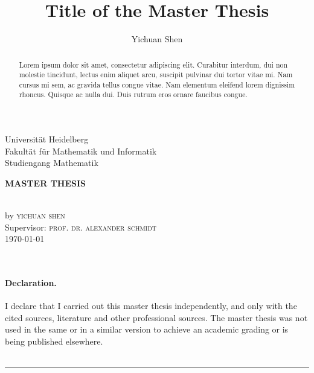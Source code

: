 \documentclass[11pt,a4paper,openany]{memoir}
\author{Yichuan Shen}
\title{Title of the Master Thesis}
\begin{document}
\theoremstyle{plain}
\theoremstyle{definition}
\newtheorem{theorem}{Theorem}[chapter]
\newtheorem{lemma}[theorem]{Lemma}
\newtheorem{proposition}[theorem]{Proposition}
\newtheorem{corollary}[theorem]{Corollary}
\theoremstyle{definition}
\newtheorem*{definition}{Definition}
\newtheorem*{example}{Example}
\theoremstyle{remark}
\newtheorem*{remark}{Remark}

\frontmatter
{} 

\makeatletter
\begin{center}
\vspace*{0cm}
\begin{large}
Universität Heidelberg\\
Fakultät für Mathematik und Informatik\\
Studiengang Mathematik\\
\vspace{8mm}
\end{large}
\vfill 
\begin{large}
\textbf{MASTER THESIS}\\
\end{large}
\vspace{10mm}
\begin{huge}\@title \end{huge}\\
\vspace{10mm}
by \textsc{yichuan shen}\\
\vspace{3cm}
\vfill
Supervisor: \textsc{prof. dr. alexander schmidt}\\
\today
\end{center}
\makeatother

\clearpage
\ 
\clearpage

\vspace*{0cm}
\vfill
\paragraph{Declaration.} I declare that I carried out this master thesis independently, and only with the cited sources, literature and other professional sources. The master thesis was not used in the same or in a similar version to achieve an academic grading or is being published elsewhere.\\
\vspace{7mm}\\
\rule{7cm}{0.4pt}
\clearpage

\vspace*{0cm}
\vfill
\renewcommand{\abstractname}{Abstract}
\begin{abstract}
Lorem ipsum dolor sit amet, consectetur adipiscing elit. Curabitur interdum, dui non molestie tincidunt, lectus enim aliquet arcu, suscipit pulvinar dui tortor vitae mi. Nam cursus mi sem, ac gravida tellus congue vitae. Nam elementum eleifend lorem dignissim rhoncus. Quisque ac nulla dui. Duis rutrum eros ornare faucibus congue.
\end{abstract}
\end{document}
